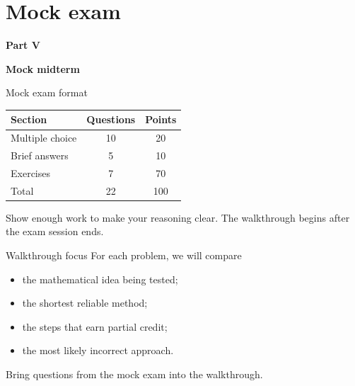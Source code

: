 \documentclass[aspectratio=169]{beamer}
\newcommand{\sectioncard}[2]{%
  \begin{frame}[plain]
    \vfill\centering
    {\Huge\color{lectureorange}\bfseries #1}\par\bigskip
    {\LARGE\color{lecturegreen}\bfseries #2}
    \vfill
  \end{frame}}
\begin{document}
\section{Mock exam}
\sectioncard{Part V}{Mock midterm}

\begin{frame}{Mock exam format}
\begin{center}
\renewcommand{\arraystretch}{1.4}
\begin{tabular}{lcc}
\toprule
Section & Questions & Points \\
\midrule
Multiple choice & 10 & 20 \\
Brief answers & 5 & 10 \\
Exercises & 7 & 70 \\
\midrule
Total & 22 & 100 \\
\bottomrule
\end{tabular}
\end{center}
\medskip
Show enough work to make your reasoning clear. The walkthrough begins after the exam session ends.
\end{frame}

\begin{frame}{Walkthrough focus}
For each problem, we will compare
\begin{itemize}
  \item the mathematical idea being tested;
  \item the shortest reliable method;
  \item the steps that earn partial credit;
  \item the most likely incorrect approach.
\end{itemize}
\medskip
Bring questions from the mock exam into the walkthrough.
\end{frame}
\end{document}
